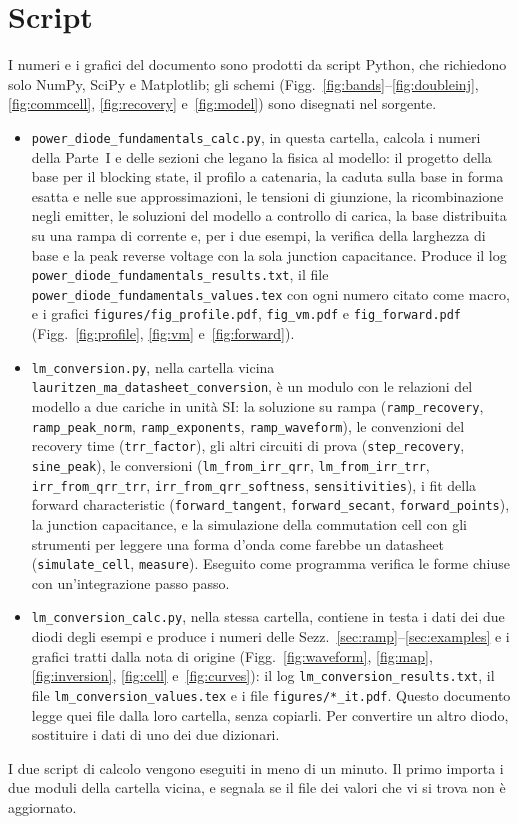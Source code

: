 \documentclass[10pt,a4paper]{scrartcl}
\begin{document}
\section{Script}
\label{app:scripts}
I numeri e i grafici del documento sono prodotti da script Python, che richiedono solo NumPy, SciPy e Matplotlib; gli schemi (Figg.~\ref{fig:bands}--\ref{fig:doubleinj}, \ref{fig:commcell}, \ref{fig:recovery} e~\ref{fig:model}) sono disegnati nel sorgente.
\begin{itemize}
\emergencystretch=3em
\item \texttt{power\_diode\_fundamentals\_calc.py}, in questa cartella, calcola i numeri della Parte~I e delle sezioni che legano la fisica al modello: il progetto della base per il blocking state, il profilo a catenaria, la caduta sulla base in forma esatta e nelle sue approssimazioni, le tensioni di giunzione, la ricombinazione negli emitter, le soluzioni del modello a controllo di carica, la base distribuita su una rampa di corrente e, per i due esempi, la verifica della larghezza di base e la peak reverse voltage con la sola junction capacitance. Produce il log \texttt{power\_diode\_fundamentals\_results.txt}, il file \texttt{power\_diode\_fundamentals\_values.tex} con ogni numero citato come macro, e i grafici \texttt{figures/fig\_profile.pdf}, \texttt{fig\_vm.pdf} e \texttt{fig\_forward.pdf} (Figg.~\ref{fig:profile}, \ref{fig:vm} e~\ref{fig:forward}).
\item \texttt{lm\_conversion.py}, nella cartella vicina \texttt{lauritzen\_ma\_datasheet\_conversion}, è un modulo con le relazioni del modello a due cariche in unità SI: la soluzione su rampa (\texttt{ramp\_recovery}, \texttt{ramp\_peak\_norm}, \texttt{ramp\_exponents}, \texttt{ramp\_waveform}), le convenzioni del recovery time (\texttt{trr\_factor}), gli altri circuiti di prova (\texttt{step\_recovery}, \texttt{sine\_peak}), le conversioni (\texttt{lm\_from\_irr\_qrr}, \texttt{lm\_from\_irr\_trr}, \texttt{irr\_from\_qrr\_trr}, \texttt{irr\_from\_qrr\_softness}, \texttt{sensitivities}), i fit della forward characteristic (\texttt{forward\_tangent}, \texttt{forward\_secant}, \texttt{forward\_points}), la junction capacitance, e la simulazione della commutation cell con gli strumenti per leggere una forma d'onda come farebbe un datasheet (\texttt{simulate\_cell}, \texttt{measure}). Eseguito come programma verifica le forme chiuse con un'integrazione passo passo.
\item \texttt{lm\_conversion\_calc.py}, nella stessa cartella, contiene in testa i dati dei due diodi degli esempi e produce i numeri delle Sezz.~\ref{sec:ramp}--\ref{sec:examples} e i grafici tratti dalla nota di origine (Figg.~\ref{fig:waveform}, \ref{fig:map}, \ref{fig:inversion}, \ref{fig:cell} e~\ref{fig:curves}): il log \texttt{lm\_conversion\_results.txt}, il file \texttt{lm\_conversion\_values.tex} e i file \texttt{figures/*\_it.pdf}. Questo documento legge quei file dalla loro cartella, senza copiarli. Per convertire un altro diodo, sostituire i dati di uno dei due dizionari.
\end{itemize}
I due script di calcolo vengono eseguiti in meno di un minuto. Il primo importa i due moduli della cartella vicina, e segnala se il file dei valori che vi si trova non è aggiornato.
\end{document}

